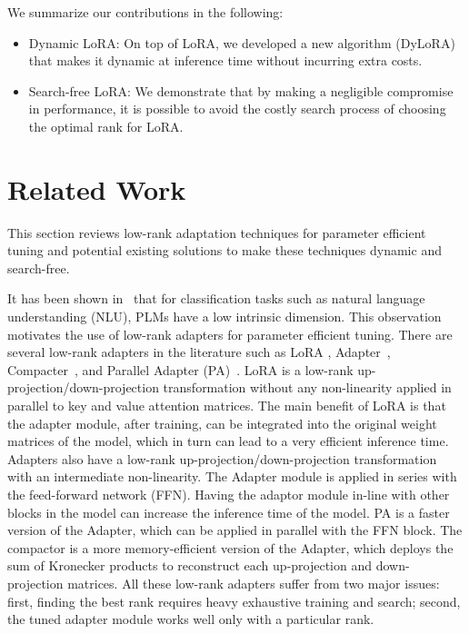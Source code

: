 We summarize our contributions in the following:

\begin{itemize}
    \item Dynamic LoRA: On top of LoRA, we developed a new algorithm (DyLoRA) that makes it dynamic at inference time without incurring extra costs.

    \item Search-free LoRA: We demonstrate that by making a negligible compromise in performance, it is possible to avoid the costly search process of choosing the optimal rank for LoRA.

\end{itemize}

\section{Related Work} This section reviews low-rank adaptation techniques for parameter efficient tuning and potential existing solutions to make these techniques dynamic and search-free.  

It has been shown in~\cite{aghajanyan2020intrinsic} that for classification tasks such as natural language understanding (NLU), PLMs have a low intrinsic dimension. This observation motivates the use of low-rank adapters for parameter efficient tuning. There are several low-rank adapters in the literature such as LoRA \citep{lora}, Adapter~\citep{adapter}, Compacter~\citep{karimi2021compacter}, and Parallel Adapter (PA)~\citep{he2021towards}. LoRA is a low-rank up-projection/down-projection transformation without any non-linearity applied in parallel to key and value attention matrices. The main benefit of LoRA is that the adapter module, after training, can be integrated into the original weight matrices of the model, which in turn can lead to a very efficient inference time. Adapters also have a low-rank up-projection/down-projection transformation with an intermediate non-linearity. The Adapter module is applied in series with the feed-forward network (FFN). Having the adaptor module in-line with other blocks in the model can increase the inference time of the model. PA is a faster version of the Adapter, which can be applied in parallel with the FFN block. The compactor is a more memory-efficient version of the Adapter, which deploys the sum of Kronecker products to reconstruct each up-projection and down-projection matrices. All these low-rank adapters suffer from two major issues: first, finding the best rank requires heavy exhaustive training and search; second, the tuned adapter module works well only with a particular rank.

